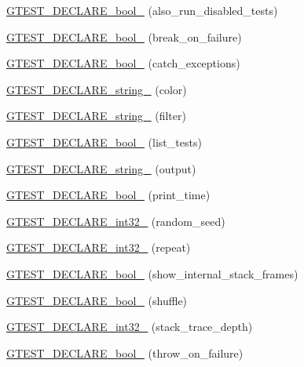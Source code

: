 \begin{DoxyCompactItemize}
\item 
\hyperlink{namespacetesting_a4c08ba9fcb0581c61e25968e520efa48}{G\+T\+E\+S\+T\+\_\+\+D\+E\+C\+L\+A\+R\+E\+\_\+bool\+\_\+} (also\+\_\+run\+\_\+disabled\+\_\+tests)
\item 
\hyperlink{namespacetesting_a5868c3980b2f69f511fc8c3de7cdfc17}{G\+T\+E\+S\+T\+\_\+\+D\+E\+C\+L\+A\+R\+E\+\_\+bool\+\_\+} (break\+\_\+on\+\_\+failure)
\item 
\hyperlink{namespacetesting_ab6f1777f7b740f31e41f7da017447b58}{G\+T\+E\+S\+T\+\_\+\+D\+E\+C\+L\+A\+R\+E\+\_\+bool\+\_\+} (catch\+\_\+exceptions)
\item 
\hyperlink{namespacetesting_a0f658c915a1e60996a2ab00a06612723}{G\+T\+E\+S\+T\+\_\+\+D\+E\+C\+L\+A\+R\+E\+\_\+string\+\_\+} (color)
\item 
\hyperlink{namespacetesting_a20d69860ce843142c7f740262e6b0c9a}{G\+T\+E\+S\+T\+\_\+\+D\+E\+C\+L\+A\+R\+E\+\_\+string\+\_\+} (filter)
\item 
\hyperlink{namespacetesting_af2cd3595c571ca408afc337bc4bb2619}{G\+T\+E\+S\+T\+\_\+\+D\+E\+C\+L\+A\+R\+E\+\_\+bool\+\_\+} (list\+\_\+tests)
\item 
\hyperlink{namespacetesting_a3fe54dd551f1c36cfdd1b36cd6881a44}{G\+T\+E\+S\+T\+\_\+\+D\+E\+C\+L\+A\+R\+E\+\_\+string\+\_\+} (output)
\item 
\hyperlink{namespacetesting_aeccefd463a0942da24750e1bbee76041}{G\+T\+E\+S\+T\+\_\+\+D\+E\+C\+L\+A\+R\+E\+\_\+bool\+\_\+} (print\+\_\+time)
\item 
\hyperlink{namespacetesting_ae754999b59509808254d39e3a3cf38e0}{G\+T\+E\+S\+T\+\_\+\+D\+E\+C\+L\+A\+R\+E\+\_\+int32\+\_\+} (random\+\_\+seed)
\item 
\hyperlink{namespacetesting_a315ef0647e4f2795bf1705de8e9c9659}{G\+T\+E\+S\+T\+\_\+\+D\+E\+C\+L\+A\+R\+E\+\_\+int32\+\_\+} (repeat)
\item 
\hyperlink{namespacetesting_af37b9206b938bb8b7d398a1379eb7482}{G\+T\+E\+S\+T\+\_\+\+D\+E\+C\+L\+A\+R\+E\+\_\+bool\+\_\+} (show\+\_\+internal\+\_\+stack\+\_\+frames)
\item 
\hyperlink{namespacetesting_a6d87f7374e105483905a305328856f4b}{G\+T\+E\+S\+T\+\_\+\+D\+E\+C\+L\+A\+R\+E\+\_\+bool\+\_\+} (shuffle)
\item 
\hyperlink{namespacetesting_adba6f8afa0f8695956d0134f1629a10b}{G\+T\+E\+S\+T\+\_\+\+D\+E\+C\+L\+A\+R\+E\+\_\+int32\+\_\+} (stack\+\_\+trace\+\_\+depth)
\item 
\hyperlink{namespacetesting_ac69f2aeeb84dc5f49bd3d040a6f32d17}{G\+T\+E\+S\+T\+\_\+\+D\+E\+C\+L\+A\+R\+E\+\_\+bool\+\_\+} (throw\+\_\+on\+\_\+failure)

\end{DoxyCompactItemize}
